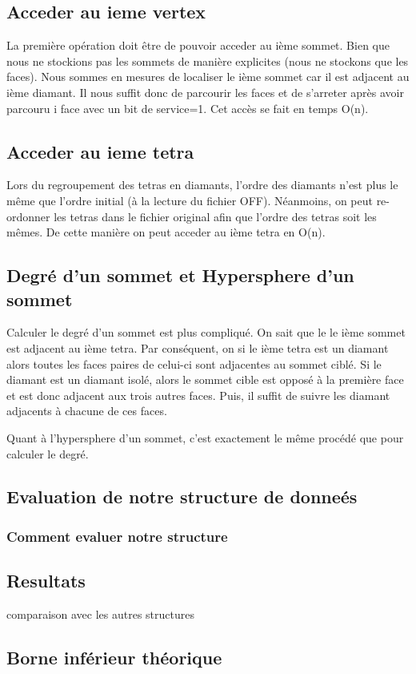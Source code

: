 \documentclass[a4paper,11pt,openany]{article}
\begin{document}
\subsection{Acceder au ieme vertex}
La première opération doit être de pouvoir acceder au ième sommet. Bien que nous ne stockions pas les sommets de manière explicites (nous ne stockons que les faces). Nous sommes en mesures de localiser le ième sommet car il est adjacent au ième diamant.
Il nous suffit donc de parcourir les faces et de s'arreter après avoir parcouru i face avec un bit de service=1.
Cet accès se fait en temps O(n).
\subsection{Acceder au ieme tetra}
Lors du regroupement des tetras en diamants, l'ordre des diamants n'est plus le même que l'ordre initial (à la lecture du fichier OFF). Néanmoins, on peut re-ordonner les tetras dans le fichier original afin que l'ordre des tetras soit les mêmes. De cette manière on peut acceder au ième tetra en O(n).
\subsection{Degré d'un sommet et Hypersphere d'un sommet}
Calculer le degré d'un sommet est plus compliqué. On sait que le le ième sommet est adjacent au ième tetra. Par conséquent, on si le ième tetra est un diamant alors toutes les faces paires de celui-ci sont adjacentes au sommet ciblé. Si le diamant est un diamant isolé, alors le sommet cible est opposé à la première face et est donc adjacent aux trois autres faces. Puis, il suffit de suivre les diamant adjacents à chacune de ces faces.

Quant à l'hypersphere d'un sommet, c'est exactement le même procédé que pour calculer le degré.

\subsection{Evaluation de notre structure de donneés}
\subsubsection{Comment evaluer notre structure}
\subsection{Resultats}
comparaison avec les autres structures
\subsection{Borne inférieur théorique}
\end{document}
